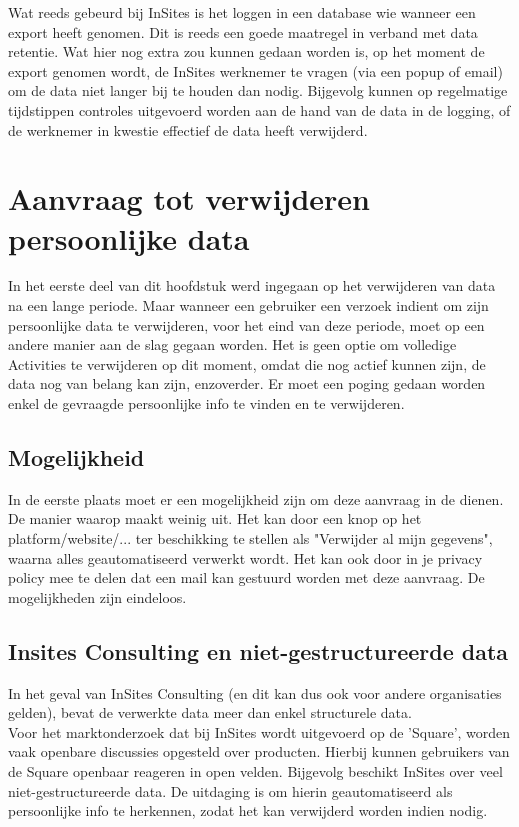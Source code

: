 Wat reeds gebeurd bij InSites is het loggen in een database wie wanneer een export heeft genomen. Dit is reeds een goede maatregel in verband met data retentie. Wat hier nog extra zou kunnen gedaan worden is, op het moment de export genomen wordt, de InSites werknemer te vragen (via een popup of email) om de data niet langer bij te houden dan nodig. Bijgevolg kunnen op regelmatige tijdstippen controles uitgevoerd worden aan de hand van de data in de logging, of de werknemer in kwestie effectief de data heeft verwijderd. 

\section{Aanvraag tot verwijderen persoonlijke data}

In het eerste deel van dit hoofdstuk werd ingegaan op het verwijderen van data na een lange periode. Maar wanneer een gebruiker een verzoek indient om zijn persoonlijke data te verwijderen, voor het eind van deze periode, moet op een andere manier aan de slag gegaan worden. Het is geen optie om volledige Activities te verwijderen op dit moment, omdat die nog actief kunnen zijn, de data nog van belang kan zijn, enzoverder. Er moet een poging gedaan worden enkel de gevraagde persoonlijke info te vinden en te verwijderen. 
 
\subsection{Mogelijkheid}
In de eerste plaats moet er een mogelijkheid zijn om deze aanvraag in de dienen. De manier waarop maakt weinig uit. Het kan door een knop op het platform/website/... ter beschikking te stellen als "Verwijder al mijn gegevens", waarna alles geautomatiseerd verwerkt wordt. Het kan ook door in je privacy policy mee te delen dat een mail kan gestuurd worden met deze aanvraag. De mogelijkheden zijn eindeloos. 
 
\subsection{Insites Consulting en niet-gestructureerde data}

In het geval van InSites Consulting (en dit kan dus ook voor andere organisaties gelden), bevat de verwerkte data meer dan enkel structurele data. \\
Voor het marktonderzoek dat bij InSites wordt uitgevoerd op de 'Square', worden vaak openbare discussies opgesteld over producten. Hierbij kunnen gebruikers van de Square openbaar reageren in open velden. Bijgevolg beschikt InSites over veel niet-gestructureerde data. 
 De uitdaging is om hierin geautomatiseerd als persoonlijke info te herkennen, zodat het kan verwijderd worden indien nodig.
 
